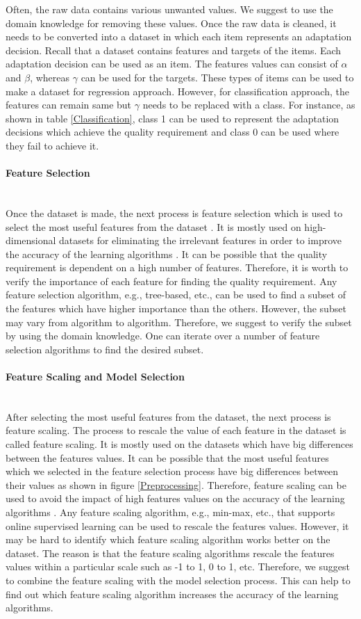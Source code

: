 \documentclass[a4paper,12pt]{article}
\newcommand{
    \subsubsubsection}[1]{\paragraph{#1}\mbox{}\\
}
\begin{document}
Often, the raw data contains various unwanted values. We suggest to use the domain knowledge for removing these values. Once the raw data is cleaned, it needs to be converted into a dataset in which each item represents an adaptation decision. Recall that a dataset contains features and targets of the items. Each adaptation decision can be used as an item. The features values can consist of $\alpha$ and $\beta$, whereas $\gamma$ can be used for the targets. These types of items can be used to make a dataset for regression approach. However, for classification approach, the features can remain same but $\gamma$ needs to be replaced with a class. For instance, as shown in table \ref{Classification}, class 1 can be used to represent the adaptation decisions which achieve the quality requirement and class 0 can be used where they fail to achieve it.
\subsubsubsection{Feature Selection}
Once the dataset is made, the next process is feature selection which is used to select the most useful features from the dataset \cite{HOMLWSLATF-2017}. It is mostly used on high-dimensional datasets for eliminating the irrelevant features in order to improve the accuracy of the learning algorithms \cite{SLMLIP-2011}. It can be possible that the quality requirement is dependent on a high number of features. Therefore, it is worth to verify the importance of each feature for finding the quality requirement. Any feature selection algorithm, e.g., tree-based, etc., can be used to find a subset of the features which have higher importance than the others. However, the subset may vary from algorithm to algorithm. Therefore, we suggest to verify the subset by using the domain knowledge. One can iterate over a number of feature selection algorithms to find the desired subset.
\subsubsubsection{Feature Scaling and Model Selection}
After selecting the most useful features from the dataset, the next process is feature scaling. The process to rescale the value of each feature in the dataset is called feature scaling. It is mostly used on the datasets which have big differences between the features values. It can be possible that the most useful features which we selected in the feature selection process have big differences between their values as shown in figure \ref{Preprocessing}. Therefore, feature scaling can be used to avoid the impact of high features values on the accuracy of the learning algorithms \cite{HOMLWSLATF-2017}. Any feature scaling algorithm, e.g., min-max, etc., that supports online supervised learning can be used to rescale the features values. However, it may be hard to identify which feature scaling algorithm works better on the dataset. The reason is that the feature scaling algorithms rescale the features values within a particular scale such as -1 to 1, 0 to 1, etc. Therefore, we suggest to combine the feature scaling with the model selection process. This can help to find out which feature scaling algorithm increases the accuracy of the learning algorithms.
\end{document}
